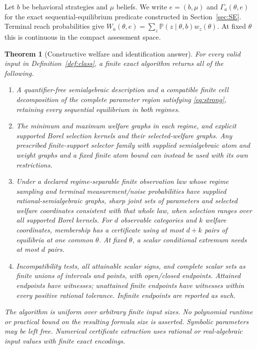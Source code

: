 \documentclass[11pt,a4paper]{article}
\numberwithin{equation}{section}
\newtheorem{theorem}{Theorem}[section]
\theoremstyle{definition}
\newcommand{\Prb}{\mathbb P}
\begin{document}
Let $b$ be behavioral strategies and $\mu$ beliefs. We write
$e=(b,\mu)$ and $\Gamma_a(\theta,e)$ for the exact sequential-equilibrium
predicate constructed in Section~\ref{sec:SE}. Terminal reach probabilities
give $W_a(\theta,e)=\sum_z\Prb(z\mid\theta,b)w_z(\theta)$.
At fixed $\theta$ this is continuous in the compact assessment space.

\begin{theorem}[Constructive welfare and identification answer]\label{thm:main}
For every valid input in Definition~\ref{def:class}, a finite exact algorithm
returns all of the following.

\begin{enumerate}
\item A quantifier-free semialgebraic description and a compatible finite
cell decomposition of the complete parameter region satisfying
\eqref{eq:strong}, retaining every sequential equilibrium in both regimes.
\item The minimum and maximum welfare graphs in each regime, and explicit
supported Borel selection kernels and their selected-welfare graphs.
Any prescribed finite-support selector family with supplied semialgebraic
atom and weight graphs and a fixed finite atom bound can instead be used
with its own restrictions.
\item Under a declared regime-separable finite observation law whose regime
sampling and terminal measurement/noise probabilities have supplied
rational-semialgebraic graphs, sharp joint
sets of parameters and selected welfare coordinates consistent with that
\emph{whole law}, when selection ranges over all supported Borel kernels.
For $d$ observable categories and $k$ welfare coordinates, membership has
a certificate using at most $d+k$ pairs of equilibria at one common
$\theta$. At fixed $\theta$, a scalar conditional extremum needs at most
$d$ pairs.
\item Incompatibility tests, all attainable scalar signs, and complete
scalar sets as finite unions of intervals and points, with open/closed
endpoints. Attained endpoints have witnesses; unattained finite endpoints
have witnesses within every positive rational tolerance. Infinite endpoints
are reported as such.
\end{enumerate}
The algorithm is uniform over arbitrary finite input sizes. No polynomial
runtime or practical bound on the resulting formula size is asserted.
Symbolic parameters may be left free. Numerical certificate extraction uses
rational or real-algebraic input values with finite exact encodings.
\end{theorem}
\end{document}
